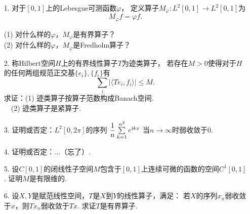 \begin{itemize}
\item[1.] 对于$[0,1]$上的Lebesgue可测函数$\varphi$，
定义算子$M_\varphi\colon L^2[0,1]\rightarrow L^2[0,1]$为
$$M_\varphi f=\varphi f.$$

\quad (1) 对什么样的$\varphi$，$M_\varphi$是有界算子？\\
\quad (2) 对什么样的$\varphi$，$M_\varphi$是Fredholm算子？

\item[2.] 称Hilbert空间$H$上的有界线性算子$T$为迹类算子，
若存在$M>0$使得对于$H$的任何两组规范正交基$\{e_i\}, \{f_i\}$有
$$\sum_i |\langle Te_i,f_i\rangle|\leqslant M.$$
求证：(1) 迹类算子按算子范数构成Banach空间.\\
\qquad\ \ (2) 迹类算子是紧算子.

\item[3.] 证明或否定：$L^2[0,2\pi]$的序列
$\dfrac{1}{n}\sum\limits_{k=1}^{n^2}e^{{\rm i}kx}$
当$n\rightarrow\infty$时弱收敛于$0$.

\item[4.] 证明或否定：...（忘了）.

\item[5.] 设$C[0,1]$的闭线性子空间$M$包含于$[0,1]$上连续可微的函数的空间$C^1[0,1]$. 
证明$M$是有限维的.\\
[上传者注：本题解答见\cite{iv}第二章\S3例21.]

\item[6.] 设$X, Y$是赋范线性空间，$T$是$X$到$Y$的线性算子，满足：
若$X$的序列$x_n$弱收敛于$x$，则$Tx_n$弱收敛于$Tx$. 求证$T$是有界算子.
\end{itemize}

